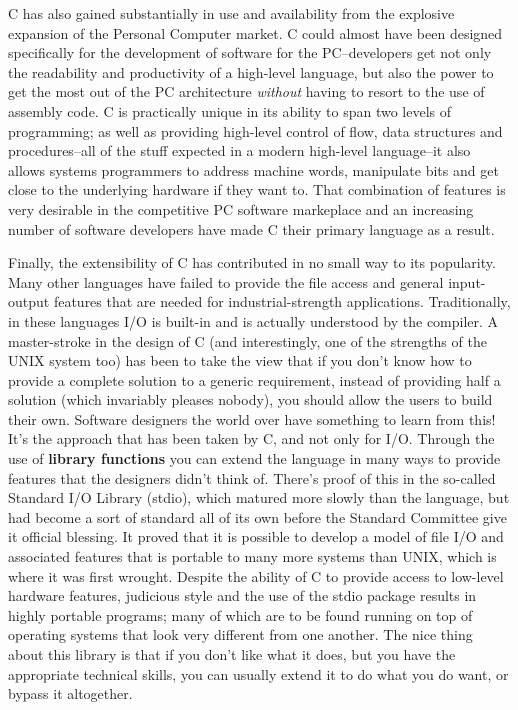   C has also gained substantially in use and availability from the
   explosive expansion of the Personal Computer market. C could almost
   have been designed specifically for the development of software for the
   PC--developers get not only the readability and productivity of a
   high-level language, but also the power to get the most out of the PC
   architecture \textit{without} having to resort to the use of assembly code.
   C is practically unique in its ability to span two levels of
   programming; as well as providing high-level control of flow, data
   structures and procedures--all of the stuff expected in a modern
   high-level language--it also allows systems programmers to address
   machine words, manipulate bits and get close to the underlying hardware if
   they want to. That combination of features is very desirable in the
   competitive PC software markeplace and an increasing number of software
   developers have made C their primary language as a result.


  Finally, the extensibility of C has contributed in no small way to its
   popularity. Many other languages have failed to provide the file access and
   general input-output features that are needed for industrial-strength
   applications. Traditionally, in these languages I/O is built-in and is
   actually understood by the compiler. A master-stroke in the design
   of C (and interestingly, one of the strengths of the UNIX system too)
   has been to take the view that if you don't know how to provide a complete
   solution to a generic requirement, instead of providing half a solution
   (which invariably pleases nobody), you should allow the users to build
   their own. Software designers the world over have something to learn from
   this! It's the approach that has been taken by C, and not only for I/O.
   Through the use of \textbf{library functions} you can extend the language
   in many ways to provide features that the designers didn't think of.
   There's proof of this in the so-called Standard I/O Library (stdio), which
   matured more slowly than the language, but had become a sort of standard
   all of its own before the Standard Committee give it official blessing. It
   proved that it is possible to develop a model of file I/O and associated
   features that is portable to many more systems than UNIX, which is where it
   was first wrought. Despite the ability of C to provide access to low-level
   hardware features, judicious style and the use of the stdio package results
   in highly portable programs; many of which are to be found running on top
   of operating systems that look very different from one another. The nice
   thing about this library is that if you don't like what it does, but you
   have the appropriate technical skills, you can usually extend it to do what
   you do want, or bypass it altogether.


